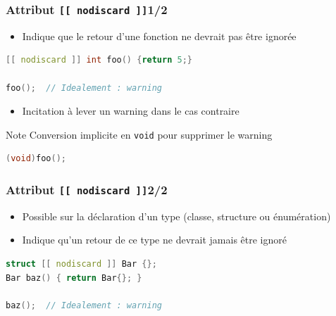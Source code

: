 \documentclass[C++.tex]{subfiles}
\begin{document}
\begin{frame}[fragile]
	\frametitle{Attribut \lstinline|[[ nodiscard ]]|\titlehfill{}1/2}
	\begin{itemize}
		\item Indique que le retour d'une fonction ne devrait pas être ignorée
	\end{itemize}

	\begin{lstlisting}[language=C++]
[[ nodiscard ]] int foo() {return 5;}

foo();  // Idealement : warning\end{lstlisting}

	\begin{itemize}
		\item Incitation à lever un warning dans le cas contraire
	\end{itemize}

	\begin{block}{Note}
		Conversion implicite en \lstinline|void| pour supprimer le warning
		\begin{lstlisting}[language=C++]
(void)foo();\end{lstlisting}

	\end{block}
\end{frame}

\begin{frame}[fragile]
	\frametitle{Attribut \lstinline|[[ nodiscard ]]|\titlehfill{}2/2}
	\begin{itemize}
		\item Possible sur la déclaration d'un type (classe, structure ou énumération)
		\item Indique qu'un retour de ce type ne devrait jamais être ignoré
	\end{itemize}

	\begin{lstlisting}[language=C++]
struct [[ nodiscard ]] Bar {};
Bar baz() { return Bar{}; }

baz();  // Idealement : warning\end{lstlisting}
\end{frame}
\end{document}
